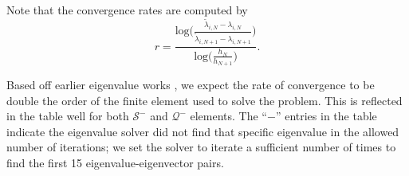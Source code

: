 \documentclass[format=acmsmall,screen,timestamp=false,a4paper]{acmart}
\newcommand{\calQ}{\mathcal{Q}}
\newcommand{\calS}{\mathcal{S}}
\begin{document}


Note that the convergence rates are computed by
\[r = \frac{\text{log}\bigg(\frac{\tilde{\lambda}_{i,N} - \lambda_{i,N}}{\tilde{\lambda}_{i,N+1} - \lambda_{i,N+1}} \bigg)}{\text{log}\bigg( \frac{h_N}{h_{N+1}} \bigg)}. \]

\noindent  Based off earlier eigenvalue works \cite{boffi2010finite}, we expect the rate of convergence to be double the order of the finite element used to solve the problem.  This is reflected in the table well for both $\mathcal{S}^-$ and $\mathcal{Q}^-$ elements.  The ``$-$'' entries in the table indicate the eigenvalue solver did not find that specific eigenvalue in the allowed number of iterations; we set the solver to iterate a sufficient number of times to find the first 15 eigenvalue-eigenvector pairs.
\end{document}

